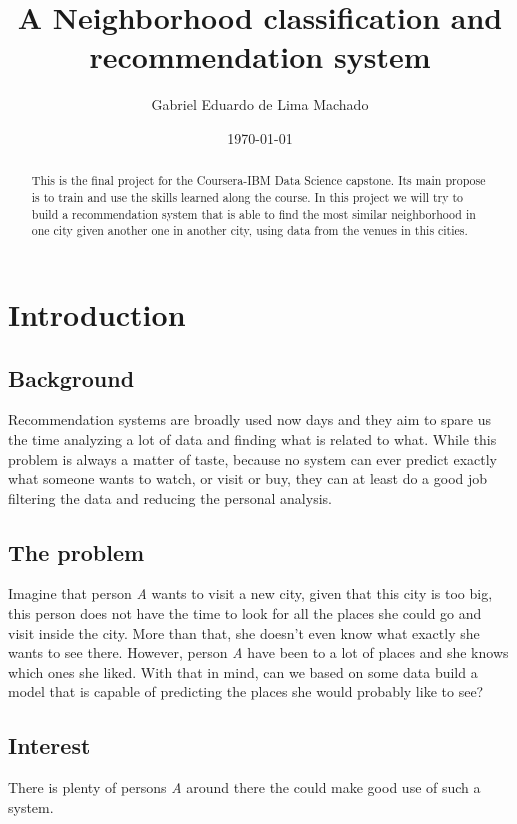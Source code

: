 \documentclass{article}
\title{A Neighborhood classification and recommendation system}
\author{Gabriel Eduardo de Lima Machado}
\date{\today}
\begin{document}
\maketitle

\begin{abstract}

This is the final project for the Coursera-IBM Data Science capstone. Its main propose is to train and use the skills learned along the course. In this project we will try to build a recommendation system that is able to find the most similar neighborhood in one city given another one in another city, using data from the venues in this cities.   

\end{abstract}

\section{Introduction}

\subsection{Background}
Recommendation systems are broadly used now days and they aim to spare us the time analyzing a lot of data and finding what is related to what. While this problem is always a matter of taste, because no system can ever predict exactly what someone wants to watch, or visit or buy, they can at least do a good job filtering the data and reducing the personal analysis. 

\subsection{The problem}
Imagine that person \emph{A} wants to visit a new city, given that this city is too big, this person does not have the time to look for all the places she could go and visit inside the city. More than that, she doesn't even know what exactly she wants to see there. However, person \emph{A} have been to a lot of places and she knows which ones she liked. With that in mind, can we based on some data build a model that is capable of predicting the places she would probably like to see?

\subsection{Interest}
There is plenty of persons \emph{A} around there the could make good use of such a system.
\end{document}

